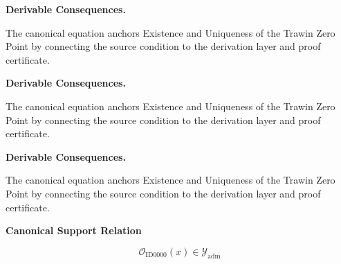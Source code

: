 \begin{minipage}[t]{0.49\linewidth}
\begin{minipage}[t]{0.49\linewidth}
\begin{minipage}[t]{0.49\linewidth}
\begin{minipage}[t]{0.49\linewidth}
\begin{minipage}[t]{0.49\linewidth}
\begin{minipage}[t]{0.49\linewidth}
\begin{minipage}[t]{0.49\linewidth}
\begin{minipage}[t]{0.49\linewidth}
\begin{minipage}[t]{0.49\linewidth}
\begin{minipage}[t]{0.49\linewidth}
\begin{minipage}[t]{0.49\linewidth}
\begin{minipage}[t]{0.49\linewidth}
\begin{minipage}[t]{0.49\linewidth}
\begin{minipage}[t]{0.49\linewidth}
\begin{minipage}[t]{0.49\linewidth}
\begin{minipage}[t]{0.49\linewidth}
\begin{minipage}[t]{0.49\linewidth}
\begin{minipage}[t]{0.49\linewidth}
\begin{minipage}[t]{0.49\linewidth}
\begin{minipage}[t]{0.49\linewidth}
\begin{minipage}[t]{0.49\linewidth}
\begin{minipage}[t]{0.49\linewidth}
\begin{minipage}[t]{0.49\linewidth}
\begin{minipage}[t]{0.49\linewidth}
\begin{minipage}[t]{0.49\linewidth}
\begin{minipage}[t]{0.49\linewidth}
\begin{minipage}[t]{0.49\linewidth}
\begin{minipage}[t]{0.49\linewidth}
\begin{minipage}[t]{0.49\linewidth}
\begin{minipage}[t]{0.49\linewidth}
\begin{minipage}[t]{0.49\linewidth}
\begin{minipage}[t]{0.49\linewidth}
\par\vspace{0.35em}
\noindent\textbf{Derivable Consequences.}\quad
\begingroup
\footnotesize
\raggedright
The canonical equation anchors Existence and Uniqueness of the Trawin Zero Point by connecting the source condition to the derivation layer and proof certificate.
\par\endgroup

\par\vspace{0.35em}
\noindent\textbf{Derivable Consequences.}\quad
\begingroup
\footnotesize
\raggedright
The canonical equation anchors Existence and Uniqueness of the Trawin Zero Point by connecting the source condition to the derivation layer and proof certificate.
\par\endgroup

\par\vspace{0.35em}
\noindent\textbf{Derivable Consequences.}\quad
\begingroup
\footnotesize
\raggedright
The canonical equation anchors Existence and Uniqueness of the Trawin Zero Point by connecting the source condition to the derivation layer and proof certificate.
\par\endgroup

\noindent\textbf{Canonical Support Relation}\par
\[
\mathcal{O}_{\mathrm{ID0000}}(x)\in\mathcal{Y}_{\mathrm{adm}}
\]

\begin{minipage}[t]{0.49\linewidth}


\end{minipage}
\end{minipage}
\end{minipage}
\end{minipage}
\end{minipage}
\end{minipage}
\end{minipage}
\end{minipage}
\end{minipage}
\end{minipage}
\end{minipage}
\end{minipage}
\end{minipage}
\end{minipage}
\end{minipage}
\end{minipage}
\end{minipage}
\end{minipage}
\end{minipage}
\end{minipage}
\end{minipage}
\end{minipage}
\end{minipage}
\end{minipage}
\end{minipage}
\end{minipage}
\end{minipage}
\end{minipage}
\end{minipage}
\end{minipage}
\end{minipage}
\end{minipage}
\end{minipage}
